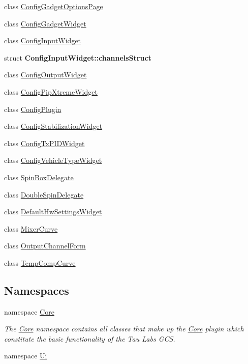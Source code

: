 \begin{DoxyCompactItemize}
\item 
class \hyperlink{class_config_gadget_options_page}{\-Config\-Gadget\-Options\-Page}
\item 
class \hyperlink{class_config_gadget_widget}{\-Config\-Gadget\-Widget}
\item 
class \hyperlink{class_config_input_widget}{\-Config\-Input\-Widget}
\item 
struct {\bfseries \-Config\-Input\-Widget\-::channels\-Struct}
\item 
class \hyperlink{class_config_output_widget}{\-Config\-Output\-Widget}
\item 
class \hyperlink{class_config_pip_xtreme_widget}{\-Config\-Pip\-Xtreme\-Widget}
\item 
class \hyperlink{class_config_plugin}{\-Config\-Plugin}
\item 
class \hyperlink{class_config_stabilization_widget}{\-Config\-Stabilization\-Widget}
\item 
class \hyperlink{class_config_tx_p_i_d_widget}{\-Config\-Tx\-P\-I\-D\-Widget}
\item 
class \hyperlink{class_config_vehicle_type_widget}{\-Config\-Vehicle\-Type\-Widget}
\item 
class \hyperlink{class_spin_box_delegate}{\-Spin\-Box\-Delegate}
\item 
class \hyperlink{class_double_spin_delegate}{\-Double\-Spin\-Delegate}
\item 
class \hyperlink{class_default_hw_settings_widget}{\-Default\-Hw\-Settings\-Widget}
\item 
class \hyperlink{class_mixer_curve}{\-Mixer\-Curve}
\item 
class \hyperlink{class_output_channel_form}{\-Output\-Channel\-Form}
\item 
class \hyperlink{class_temp_comp_curve}{\-Temp\-Comp\-Curve}
\end{DoxyCompactItemize}
\subsection*{\-Namespaces}
\begin{DoxyCompactItemize}
\item 
namespace \hyperlink{namespace_core}{\-Core}
\begin{DoxyCompactList}\small\item\em \-The \hyperlink{namespace_core}{\-Core} namespace contains all classes that make up the \hyperlink{namespace_core}{\-Core} plugin which constitute the basic functionality of the \-Tau \-Labs \-G\-C\-S. \end{DoxyCompactList}\item 
namespace \hyperlink{namespace_ui}{\-Ui}
\end{DoxyCompactItemize}
